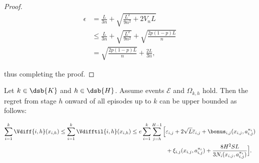 \begin{proof}
    \begin{align*}
        \epsilon &= \frac{L}{3n} + \sqrt{\frac{L^2}{9n^2} + 2 V_n L} \\
        &\le \frac{L}{3n} + \sqrt{\frac{L^2}{9n^2}} + \sqrt{\frac{2p(1-p)L}{n}} \\
        &= \sqrt{\frac{2p(1-p)L}{n}} + \frac{2L}{3n},
    \end{align*}

    thus completing the proof.
\end{proof}


\begin{lemma}
\label{lem:regr_dec}
    Let $k \in \dsb{K}$ and $h \in \dsb{H}$. Assume events $\mathcal{E}$ and $\Omega_{k,h}$ hold. Then the regret from stage $h$ onward of all episodes up to $k$ can be upper bounded as follows:

    \begin{align*}
        \sum_{i=1}^k \Vdiff{i,h}(x_{i,h}) \le \sum_{i=1}^k \Vdifftil{i,h}(x_{i,h}) \le & \ e \sum_{i=1}^k \sum_{j=h}^{H-1} \Big[ \varepsilon_{i,j} + 2 \sqrt{L} \overline{\varepsilon}_{i,j} + \bonus_{i,j}(x_{i,j}, a_{i,j}^{\pi_i}) \\
        &\qquad\qquad\quad + \xi_{i,j}(x_{i,j}, a_{i,j}^{\pi_i}) + \frac{8H^2SL}{3 N_i (x_{i,j}, a_{i,j}^{\pi_i})} \Big].
    \end{align*}
\end{lemma}

